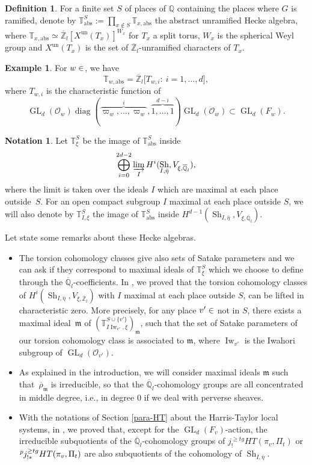 \documentclass[11pt]{article}
\newcommand{\ie}{i.e.,\xspace}
\newcommand{\NoChangel}[1]{%
\expandafter\let\csname old\string#1\endcsname=#1
\let#1=\relax
\newcommand{#1}{\mathcode`l="716C\csname old\string#1\endcsname\mathcode`l="7160 }%
}
\DeclareMathOperator{\GL}{GL}
\newcommand{\abs}{\mathrm{abs}}
\newcommand{\un}{\mathrm{un}}
\theoremstyle{plain}
\theoremstyle{definition}
\newtheorem{defin}[equation]{Definition}
\newtheorem*{example}{Example}
\newtheorem{nota}[equation]{Notation}
\numberwithin{equation}{subsection}
\newcommand\Tm{{\mathbb T}}
\newcommand\Qm{{\mathbb Q}}
\newcommand\Zm{{\mathbb Z}}
\newcommand\OC{{\mathcal O}}
\newcommand{\lexp}[2]{\kern \scriptspace \vphantom{#2}^{#1}\kern-\scriptspace#2}
\DeclareMathOperator{\sh}{Sh}
\DeclareMathOperator{\Iw}{Iw}
\DeclareMathOperator{\diag}{diag}
\DeclareMathOperator{\spl}{Spl}\NoChangel{\spl}
\begin{document}
\begin{defin}
For a finite set $S$ of places of $\Qm$ containing the places where $G$ is ramified,
denote by $\Tm^S_{\abs}:=\prod_{x \not \in S} \Tm_{x,\abs}$ the
abstract unramified Hecke algebra, where
$\Tm_{x,\abs} \simeq \overline \Zm_l[X^{\un}(T_x)]^{W_x}$ for $T_x$ a split torus,
$W_x$ is the spherical Weyl group and $X^{\un}(T_x)$ is the set of $\overline \Zm_l$-unramified
characters of $T_x$.
\end{defin}

\begin{example}
For $w \in \spl$, we have
\[
\Tm_{w,\abs}=\overline \Zm_l \bigl [T_{w,i}:~ i=1,\dots,d \bigr ],
\]
where $T_{w,i}$ is the characteristic function of
\[
\GL_d(\OC_w) \diag(\overbrace{\varpi_w,\dots,\varpi_w}^{i}, \overbrace{1,\dots,1}^{d-i})
\GL_d(\OC_w) \subset \GL_d(F_w).
\]
\end{example}

\begin{nota}
Let $\Tm^S_\xi$ be the image of $\Tm^S_{\abs}$ inside
\[
\bigoplus_{i =0}^{2d-2}
\varinjlim_{{I}} H^i(\sh_{I,\bar \eta},V_{\xi,\overline \Qm_l}),
\]
where the limit is taken over
the ideals $I$ which are maximal at each place outside~$S$. For an open compact subgroup $I$ maximal at each place outside $S$,
we will also denote by $\Tm^S_{I,\xi}$ the image of $\Tm^S_{\abs}$ inside
$H^{d-1}(\sh_{I,\bar \eta},V_{\xi,\overline \Qm_l})$.
\end{nota}

Let state some remarks about these Hecke algebras.
\begin{itemize}
\item The torsion cohomology classes give also sets of Satake parameters
and we can ask if they correspond to maximal ideals of $\Tm_\xi^S$ which
we choose to define through the $\overline \Qm_l$\nobreakdash-coefficients.
In \cite{boyer-imj}, we proved that the torsion cohomology classes of
$H^i(\sh_{I,\bar \eta},V_{\xi,\overline \Zm_l})$ with
$I$ maximal at each place outside $S$, can be lifted in characteristic zero.
More precisely, for any place $v' \in \spl$ not in $S$, there exists
a maximal ideal~$\mathfrak m$ of
$(\Tm^{S \cup \{v'\} }_{I\Iw_{v'},\xi})_{\mathfrak m}$,
such that the set of Satake parameters of our torsion cohomology class
is associated to $\mathfrak m$, where $\Iw_{v'}$ is the Iwahori subgroup of $\GL_d(\OC_{v'})$.

\item As explained in the introduction, we will consider maximal ideals
$\mathfrak m$ such that~$\overline \rho_{\mathfrak m}$ is irreducible, so that
the $\overline \Qm_l$-cohomology groups are all concentrated in middle degree,
\ie in degree $0$ if we deal with perverse sheaves.

\item With the notations of Section \ref{para-HT} about the Harris-Taylor local systems,
in \cite{boyer-compositio}, we proved that, except for the $\GL_d(F_v)$-action,
the irreducible subquotients of the
$\overline \Qm_l$-cohomology groups of $j^{\geq tg}_! HT(\pi_v,\Pi_t)$ or
$\lexp p j^{\geq tg}_{!*} HT(\pi_v,\Pi_t)$ are also subquotients of
the cohomology of $\sh_{I,\bar \eta}$.
\end{itemize}
\end{document}
